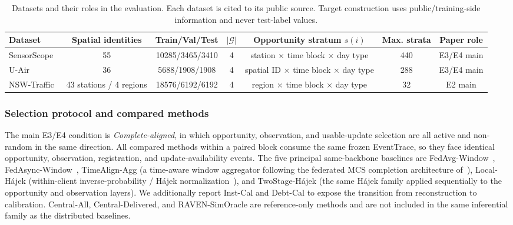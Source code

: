 \documentclass[letterpaper,journal]{IEEEtran}
\begin{document}
\begin{table}[t]
\centering
\caption{Datasets and their roles in the evaluation.  Each dataset is cited to
its public source.  Target construction uses public/training-side information
and never test-label values.}
\label{tab:datasets}
\setlength{\tabcolsep}{4.5pt}
\begin{tabular}{lcccccc}
\hline
Dataset & Spatial identities & Train/Val/Test & $|\mathcal G|$ &
Opportunity stratum $s(i)$ & Max. strata & Paper role\\
\hline
SensorScope~\cite{ingelrest2010sensorscope} & 55 & 10285/3465/3410 & 4 &
station $\times$ time block $\times$ day type & 440 & E3/E4 main\\
U-Air~\cite{zheng2013uair} & 36 & 5688/1908/1908 & 4 &
spatial ID $\times$ time block $\times$ day type & 288 & E3/E4 main\\
NSW-Traffic~\cite{tfnsw2024traffic} & 43 stations / 4 regions & 18576/6192/6192 & 4 &
region $\times$ time block $\times$ day type & 32 & E2 main\\
\hline
\end{tabular}
\end{table}

\subsubsection{Selection protocol and compared methods}

The main E3/E4 condition is \emph{Complete-aligned}, in which opportunity,
observation, and usable-update selection are all active and non-random in the
same direction.  All compared methods within a paired block consume the same
frozen EventTrace, so they face identical opportunity, observation, registration,
and update-availability events.  The five principal same-backbone baselines are
FedAvg-Window~\cite{mcmahan2017communication},
FedAsync-Window~\cite{xie2019asynchronous},
TimeAlign-Agg (a time-aware window aggregator following the federated MCS
completion architecture of~\cite{wang2026federated}),
Local-H\'ajek (within-client inverse-probability / H\'ajek
normalization~\cite{horvitz1952generalization,hajek1971comment}), and
TwoStage-H\'ajek (the same H\'ajek family applied sequentially to the
opportunity and observation layers).  We additionally report Inst-Cal and Debt-Cal to expose the
transition from reconstruction to calibration.  Central-All,
Central-Delivered, and RAVEN-SimOracle are reference-only methods and are not
included in the same inferential family as the distributed baselines.
\end{document}
